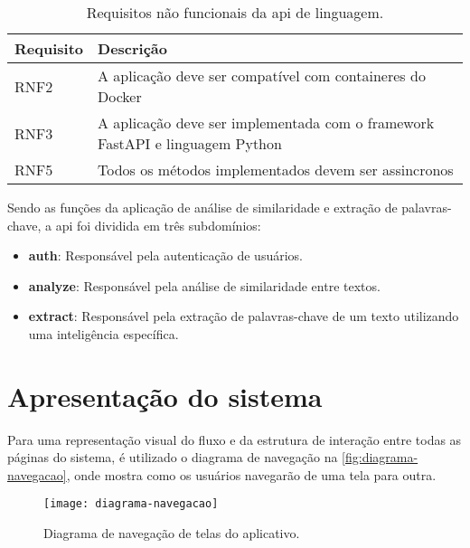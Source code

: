 \begin{table}[htb]
  \caption{Requisitos não funcionais da api de linguagem.}
  \label{tab:requisitos_nao_funcionais_linguagem}
  \begin{tabularx}{\textwidth}{l|l}
    \hline
    \textbf{Requisito} & \textbf{Descrição}                                                           \\ \hline
    RNF2               & A aplicação deve ser compatível com containeres do Docker                    \\
    RNF3               & A aplicação deve ser implementada com o framework FastAPI e linguagem Python \\
    RNF5               & Todos os métodos implementados devem ser assincronos                         \\ \hline
  \end{tabularx}
  \fonte{}
\end{table}

Sendo as funções da aplicação de análise de similaridade e extração de palavras-chave, a \gls{api} foi dividida em três subdomínios:

\begin{itemize}
  \item \textbf{auth}: Responsável pela autenticação de usuários.
  \item \textbf{analyze}: Responsável pela análise de similaridade entre textos.
  \item \textbf{extract}: Responsável pela extração de palavras-chave de um texto utilizando uma inteligência específica.
\end{itemize}


\section{Apresentação do sistema}\label{sec:apresentacao}

Para uma representação visual do fluxo e da estrutura de interação entre todas as páginas do sistema, é utilizado o diagrama de navegação na \autoref{fig:diagrama-navegacao}, onde mostra como os usuários navegarão de uma tela para outra.

\begin{figure}[htb]
  \captionsetup{width=0.43\textwidth}
  \caption{Diagrama de navegação de telas do aplicativo.}
  \label{fig:diagrama-navegacao}
  \texttt{[image: diagrama-navegacao]}
  \fonte{}
\end{figure}

